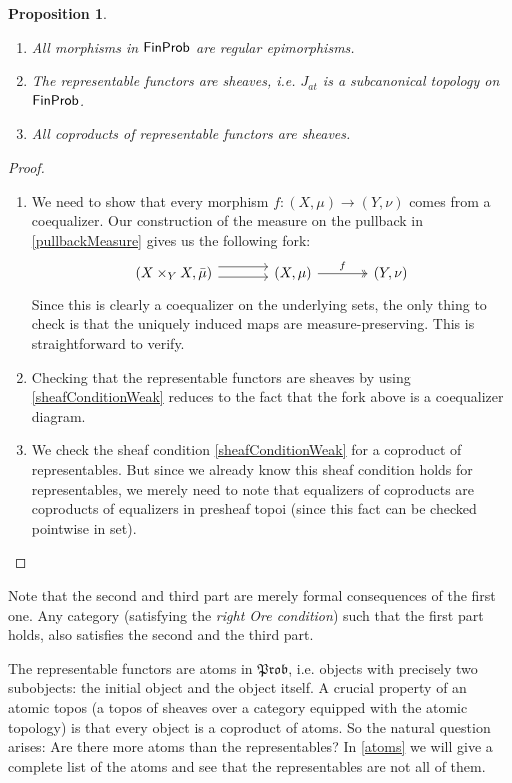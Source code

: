 \documentclass[a4paper]{amsproc}
\theoremstyle{plain}
\newtheorem{proposition}[theorem]{Proposition}
\theoremstyle{definition}
\theoremstyle{remark}
\numberwithin{equation}{section}
\newcommand{\FinProb}{\textup{\textsf{FinProb}}}
\newcommand{\Prob}{\mathfrak{Prob}}
\begin{document}
\begin{proposition}\label{subcanonical}
    \mbox{}
    \begin{enumerate}
        \item All morphisms in $\FinProb$ are regular epimorphisms.
        \item The representable functors are sheaves, i.e. $J_{at}$ is a subcanonical topology on $\FinProb$.
        \item All coproducts of representable functors are sheaves.
    \end{enumerate}
\end{proposition}
\begin{proof}
    \mbox{}
    \begin{enumerate}
        \item We need to show that every morphism $f:(X,\mu)\rightarrow (Y, \nu)$ comes from a coequalizer. Our construction of the measure on the pullback in \ref{pullbackMeasure} gives us the following fork:
        \[
        \begin{tikzcd}[column sep=large]
        (X \times_Y X, \bar{\mu}) \arrow[r, shift left=2] \arrow[r, shift right] & (X,\mu) \arrow[r, "f", two heads] & (Y,\nu)
        \end{tikzcd}
        \]
        Since this is clearly a coequalizer on the underlying sets, the only thing to check is that the uniquely induced maps are measure-preserving. This is straightforward to verify.

        \item Checking that the representable functors are sheaves by using \ref{sheafConditionWeak} reduces to the fact that the fork above is a coequalizer diagram.

        \item We check the sheaf condition \ref{sheafConditionWeak} for a coproduct of representables. But since we already know this sheaf condition holds for representables, we merely need to note that equalizers of coproducts are coproducts of equalizers in presheaf topoi (since this fact can be checked pointwise in set).
    \end{enumerate}
\end{proof}

Note that the second and third part are merely formal consequences of the first one. Any category (satisfying the \emph{right Ore condition}) such that the first part holds, also satisfies the second and the third part.

The representable functors are atoms in $\Prob$, i.e. objects with precisely two subobjects: the initial object and the object itself. A crucial property of an atomic topos (a topos of sheaves over a category equipped with the atomic topology) is that every object is a coproduct of atoms. So the natural question arises: Are there more atoms than the representables? In \ref{atoms} we will give a complete list of the atoms and see that the representables are not all of them.
\end{document}
